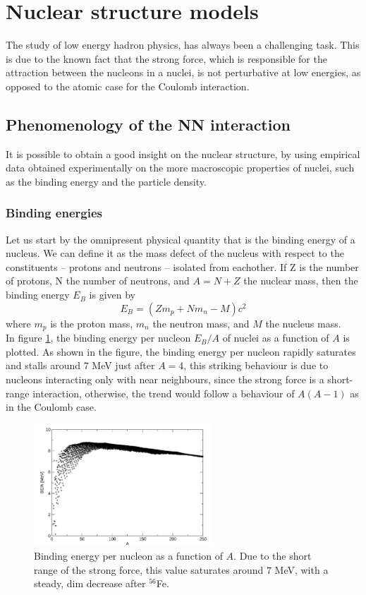 \section{Nuclear structure models}
\label{sec:models}
The study of low energy hadron physics, has always been a challenging task. This is due to the known fact that the strong force, which is responsible for the attraction between the nucleons in a nuclei, is not perturbative at low energies, as opposed to the atomic case for the Coulomb interaction.
\subsection{Phenomenology of the NN interaction}
It is possible to obtain a good insight on the nuclear structure, by using empirical data obtained experimentally on the more macroscopic properties of nuclei, such as the binding energy and the particle density.
\subsubsection{Binding energies}
Let us start by the omnipresent physical quantity that is the binding energy of a nucleus. We can define it as the mass defect of the nucleus with respect to the constituents -- protons and neutrons -- isolated from eachother. If Z is the number of protons, N the number of neutrons, and $A=N+Z$ the nuclear mass, then the binding energy $E_B$ is given by
\begin{equation}
    \label{eq:binding_energy}
    E_B = (Zm_p + Nm_n - M)c^2
\end{equation}
where $m_p$ is the proton mass, $m_n$ the neutron mass, and $M$ the nucleus mass.
\\In figure \ref{fig:BE}, the binding energy per nucleon $E_B/A$ of nuclei as a function of $A$ is plotted. As shown in the figure, the binding energy per nucleon rapidly saturates and stalls around $7$ MeV just after $A=4$, this striking behaviour is due to nucleons interacting only with near neighbours, since the strong force is a short-range interaction, otherwise, the trend would follow a behaviour of $A(A-1)$ as in the Coulomb case.
\begin{figure}[h]
    \centering
    \includegraphics[width=0.6\textwidth]{Images/BE.png}
    \caption{Binding energy per nucleon as a function of $A$. Due to the short range of the strong force, this value saturates around $7$ MeV, with a steady, dim decrease after $^{56}$Fe.}
    \label{fig:BE}
\end{figure}
